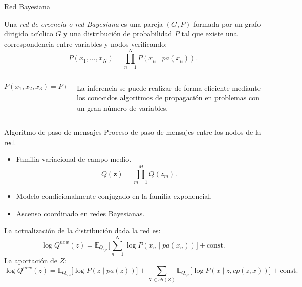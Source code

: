 \documentclass[aspectratio=169]{beamer}
\newcommand{\bz}{\bm{z}}
\newcommand\E[2]{\mathbb{E}_{#1}\Big[#2\Big]}
\begin{document}
  \begin{frame}{Red Bayesiana}
    \begin{shaded}
      Una \emph{red de creencia o red Bayesiana} es una pareja \((G,P)\) formada por un grafo dirigido acíclico \(G\) y una distribución de probabilidad \(P\) tal que existe una correspondencia entre variables y nodos verificando:
      \[
        P(x_{1},\dots,x_{N}) = \prod_{n=1}^{N}P(x_{n}\mid pa(x_{n})).
      \]
    \end{shaded}
    \begin{columns}
      \begin{column}{0.5\textwidth}
        \centering
        \[
          P(x_{1}, x_{2}, x_{3}) = P(x_{1} \mid x_{3})P(x_{2}\mid x_{3})P(x_{3}).
        \]
      \end{column}
      \begin{column}{0.5\textwidth}
        La inferencia se puede realizar de forma eficiente mediante los conocidos algoritmos de propagación en problemas con un gran número de variables.
      \end{column}
    \end{columns}
  \end{frame}

  \begin{frame}{Algoritmo de paso de mensajes}
    Proceso de paso de mensajes entre los nodos de la red.
    \begin{itemize}
      \item Familia variacional de campo medio.
        \[Q(\bz) = \prod_{m=1}^{M}Q(z_{m}).\]
      \item Modelo condicionalmente conjugado en la familia exponencial.
      \item Ascenso coordinado en redes Bayesianas.
    \end{itemize}
  \end{frame}

  \begin{frame}
    La actualización de la distribución dada la red es:
    \[
      \log Q^{new}(z) = \E{Q_{\backslash Z}}{ \sum_{n=1}^N \log P(x_n \mid pa(x_n))} + \text{const.}
    \]
     La aportación de \(Z\):
    \[
        \log Q^{new}(z) = \E{Q_{\backslash Z}}{\log P(z \mid pa(z))} + \sum_{X \in ch(Z)} \E{Q_{\backslash Z}}{\log P(x \mid z,cp(z, x))} + \text{const.}
    \]
  \end{frame}
\end{document}

